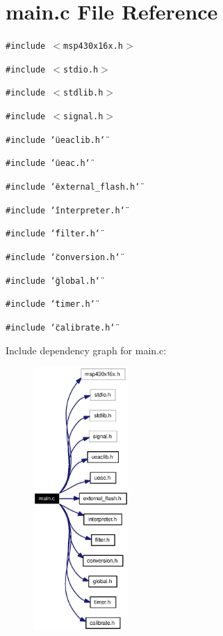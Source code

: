 \section{main.c File Reference}
\label{main_8c}
{\tt \#include $<$msp430x16x.h$>$}\par
{\tt \#include $<$stdio.h$>$}\par
{\tt \#include $<$stdlib.h$>$}\par
{\tt \#include $<$signal.h$>$}\par
{\tt \#include \char`\"{}ueaclib.h\char`\"{}}\par
{\tt \#include \char`\"{}ueac.h\char`\"{}}\par
{\tt \#include \char`\"{}external\_\-flash.h\char`\"{}}\par
{\tt \#include \char`\"{}interpreter.h\char`\"{}}\par
{\tt \#include \char`\"{}filter.h\char`\"{}}\par
{\tt \#include \char`\"{}conversion.h\char`\"{}}\par
{\tt \#include \char`\"{}global.h\char`\"{}}\par
{\tt \#include \char`\"{}timer.h\char`\"{}}\par
{\tt \#include \char`\"{}calibrate.h\char`\"{}}\par


Include dependency graph for main.c:\begin{figure}[H]
\begin{center}
\leavevmode
\includegraphics[width=103pt]{main_8c__incl}
\end{center}
\end{figure}

